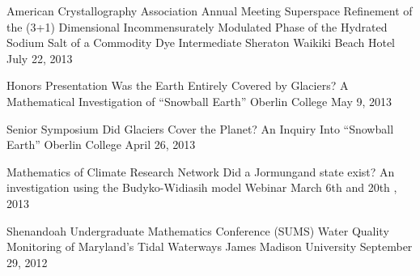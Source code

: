 

\begin{cventries}

  \cventry
    {American Crystallography Association Annual Meeting}
    {Superspace Refinement of the (3+1) Dimensional Incommensurately Modulated Phase of the Hydrated Sodium
    	Salt of a Commodity Dye Intermediate} %
    {Sheraton Waikiki Beach Hotel} %
    {July 22, 2013} %
    {
    }

  \cventry
    {Honors Presentation} %
    {Was the Earth Entirely Covered by Glaciers? A Mathematical Investigation of “Snowball Earth”} %
    {Oberlin College} %
    {May 9, 2013} %
    {
    }


\cventry
{Senior Symposium} %
{Did Glaciers Cover the Planet? An Inquiry Into “Snowball Earth”} %
{Oberlin College} %
{April 26, 2013} %
{
}


\cventry
{Mathematics of Climate Research Network} %
{Did a Jormungand state exist? An investigation using the Budyko-Widiasih model} %
{Webinar} %
{March 6th and 20th , 2013} %
{
}


\cventry
{Shenandoah Undergraduate Mathematics Conference (SUMS)} %
{Water Quality Monitoring of Maryland’s Tidal Waterways} %
{James Madison University} %
{September 29, 2012} %
{
}

\end{cventries}
